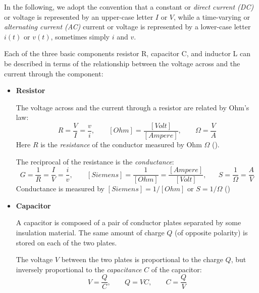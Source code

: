 \documentclass{article}
\begin{document}
In the following, we adopt the convention that a constant or 
{\em direct current (DC)} or voltage is represented by an upper-case letter 
$I$ or $V$, while a time-varying or {\em alternating current (AC)} current 
or voltage is represented by a lower-case letter $i(t)$ or $v(t)$, sometimes 
simply $i$ and $v$. 

Each of the three basic components resistor R, capacitor C, and inductor
L can be described in terms of the relationship between the voltage 
across and the current through the component:

\begin{itemize}
\item {\bf Resistor}

  The voltage across and the current through a resistor are related 
  by Ohm's law:
  \begin{equation}
    R=\frac{V}{I}=\frac{v}{i},\;\;\;\;\;\;\;[Ohm]=\frac{[Volt]}{[Ampere]},
    \;\;\;\;\;\;\;
    \Omega=\frac{V}{A}
  \end{equation}
  Here $R$ is the {\em resistance} of the conductor measured by Ohm 
  $\Omega$
  (). 

  The reciprocal of the resistance is the {\em conductance}:
  \begin{equation} 
    G=\frac{1}{R}=\frac{I}{V}=\frac{i}{v},\;\;\;\;\;\;\;
    [Siemens]=\frac{1}{[Ohm]}=\frac{[Ampere]}{[Volt]},
    \;\;\;\;\;\;S=\frac{1}{\Omega}=\frac{A}{V}
  \end{equation}
  Conductance is measured by $[Siemens]=1/[Ohm]$ or $S=1/\Omega$
  ()



\item {\bf Capacitor}

  A capacitor is composed of a pair of conductor plates separated by some 
  insulation material. The same amount of charge $Q$ (of opposite polarity) 
  is stored on each of the two plates. 

  The voltage $V$ between the two plates is proportional to the charge $Q$, 
  but inversely proportional to the {\em capacitance} $C$ of the capacitor:
  \begin{equation}
    V=\frac{Q}{C},\;\;\;\;\;\;\;Q=VC,\;\;\;\;\;\;\; C=\frac{Q}{V}
  \end{equation}


\end{itemize}
\end{document}
